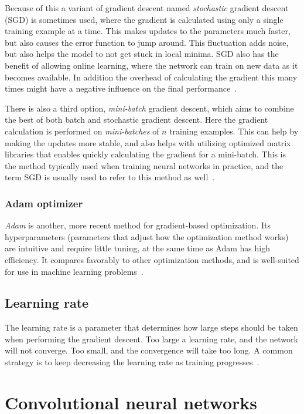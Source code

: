 \documentclass{kththesis}
\begin{document}
Because of this a variant of gradient descent named \textit{stochastic} gradient descent (SGD) is sometimes used, where the gradient is calculated using only a single training example at a time. This makes updates to the parameters much faster, but also causes the error function to jump around. This fluctuation adds noise, but also helps the model to not get stuck in local minima. SGD also has the benefit of allowing online learning, where the network can train on new data as it becomes available. In addition the overhead of calculating the gradient this many times might have a negative influence on the final performance~\cite{gradient_descent}.

There is also a third option, \textit{mini-batch} gradient descent, which aims to combine the best of both batch and stochastic gradient descent. Here the gradient calculation is performed on \textit{mini-batches} of $n$ training examples. This can help by making the updates more stable, and also helps with utilizing optimized matrix libraries that enables quickly calculating the gradient for a mini-batch. This is the method typically used when training neural networks in practice, and the term SGD is usually used to refer to this method as well~\cite{gradient_descent}.

\subsubsection{Adam optimizer}
\textit{Adam} is another, more recent method for gradient-based optimization. Its hyperparameters (parameters that adjust how the optimization method works) are intuitive and require little tuning, at the same time as Adam has high efficiency. It compares favorably to other optimization methods, and is well-suited for use in  machine learning problems~\cite{adam}.

\subsection{Learning rate}
The learning rate is a parameter that determines how large steps should be taken when performing the gradient descent. Too large a learning rate, and the network will not converge. Too small, and the convergence will take too long. A common strategy is to keep decreasing the learning rate as training progresses~\cite{Bottou2012}.

\section{Convolutional neural networks}
\end{document}

